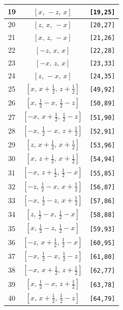 \documentclass[fleqn,8pt]{jsarticle}
\begin{document}
\begin{longtable}{ccc}
19 & $\left[ x,\, - z,\, x \right]$ & {\tt [19,25]} \\ \hline
20 & $\left[ z,\, x,\, - x \right]$ & {\tt [20,27]} \\ \hline
21 & $\left[ x,\, z,\, - x \right]$ & {\tt [21,26]} \\ \hline
22 & $\left[ - z,\, x,\, x \right]$ & {\tt [22,28]} \\ \hline
23 & $\left[ - x,\, z,\, x \right]$ & {\tt [23,33]} \\ \hline
24 & $\left[ z,\, - x,\, x \right]$ & {\tt [24,35]} \\ \hline
25 & $\left[ x,\, x + \frac{1}{2},\, z + \frac{1}{2} \right]$ & {\tt [49,92]} \\ \hline
26 & $\left[ x,\, \frac{1}{2} - x,\, \frac{1}{2} - z \right]$ & {\tt [50,89]} \\ \hline
27 & $\left[ - x,\, x + \frac{1}{2},\, \frac{1}{2} - z \right]$ & {\tt [51,90]} \\ \hline
28 & $\left[ - x,\, \frac{1}{2} - x,\, z + \frac{1}{2} \right]$ & {\tt [52,91]} \\ \hline
29 & $\left[ z,\, x + \frac{1}{2},\, x + \frac{1}{2} \right]$ & {\tt [53,96]} \\ \hline
30 & $\left[ x,\, z + \frac{1}{2},\, x + \frac{1}{2} \right]$ & {\tt [54,94]} \\ \hline
31 & $\left[ - x,\, z + \frac{1}{2},\, \frac{1}{2} - x \right]$ & {\tt [55,85]} \\ \hline
32 & $\left[ - z,\, \frac{1}{2} - x,\, x + \frac{1}{2} \right]$ & {\tt [56,87]} \\ \hline
33 & $\left[ - x,\, \frac{1}{2} - z,\, x + \frac{1}{2} \right]$ & {\tt [57,86]} \\ \hline
34 & $\left[ z,\, \frac{1}{2} - x,\, \frac{1}{2} - x \right]$ & {\tt [58,88]} \\ \hline
35 & $\left[ x,\, \frac{1}{2} - z,\, \frac{1}{2} - x \right]$ & {\tt [59,93]} \\ \hline
36 & $\left[ - z,\, x + \frac{1}{2},\, \frac{1}{2} - x \right]$ & {\tt [60,95]} \\ \hline
37 & $\left[ - x,\, \frac{1}{2} - x,\, \frac{1}{2} - z \right]$ & {\tt [61,80]} \\ \hline
38 & $\left[ - x,\, x + \frac{1}{2},\, z + \frac{1}{2} \right]$ & {\tt [62,77]} \\ \hline
39 & $\left[ x,\, \frac{1}{2} - x,\, z + \frac{1}{2} \right]$ & {\tt [63,78]} \\ \hline
40 & $\left[ x,\, x + \frac{1}{2},\, \frac{1}{2} - z \right]$ & {\tt [64,79]} \\ \hline

\end{longtable}
\end{document}
